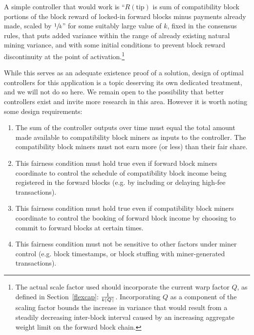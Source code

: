 A simple controller that would work is ``$R(\mathrm{tip})$ is sum of
compatibility block portions of the block reward of locked-in forward
blocks minus payments already made, scaled by $\sfrac{1}{k}$'' for
some suitably large value of $k$, fixed in the consensus rules, that
puts added variance within the range of already existing natural
mining variance, and with some initial conditions to prevent block
reward discontinuity at the point of activation.\footnote{The actual
  scale factor used should incorporate the current warp factor $Q$, as
  defined in Section~\ref{flexcap}: $\frac{1}{k\lceil Q\rceil}$.
  Incorporating $Q$ as a component of the scaling factor bounds the
  increase in variance that would result from a steadily decreasing
  inter-block interval caused by an increasing aggregate weight limit
  on the forward block chain.}

While this serves as an adequate existence proof of a solution, design
of optimal controllers for this application is a topic deserving its
own dedicated treatment, and we will not do so here.  We remain open
to the possibility that better controllers exist and invite more
research in this area.  However it is worth noting some design
requirements:

\begin{enumerate}

  \item

    The sum of the controller outputs over time must equal the total
    amount made available to compatibility block miners as inputs to
    the controller.  The compatibility block miners must not earn more
    (or less) than their fair share.

  \item

    This fairness condition must hold true even if forward block
    miners coordinate to control the schedule of compatibility block
    income being registered in the forward blocks (e.g. by including
    or delaying high-fee transactions).

  \item

    This fairness condition must hold true even if compatibility block
    miners coordinate to control the booking of forward block income
    by choosing to commit to forward blocks at certain times.

  \item

    This fairness condition must not be sensitive to other factors
    under miner control (e.g. block timestamps, or block stuffing with
    miner-generated transactions).

\end{enumerate}

